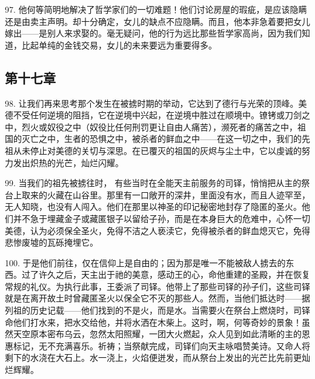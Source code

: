97. 他何等简明地解决了哲学家们的一切难题！他们讨论房屋的瑕疵，是应该隐瞒还是由卖主声明。却十分确定，女儿的缺点不应隐瞒。而且，他本非急着要把女儿嫁出——是别人来求娶的。毫无疑问，他的行为远比那些哲学家高尚，因为我们知道，比起单纯的金钱交易，女儿的未来要远为重要得多。\par


\subsection{第十七章}

\par

98. 让我们再来思考那个发生在被掳时期的举动，它达到了德行与光荣的顶峰。美德不受任何逆境的阻挡，它在逆境中兴起，在逆境中胜过在顺境中。镣铐或刀剑之中，烈火或奴役之中（奴役比任何刑罚更让自由人痛苦），濒死者的痛苦之中，祖国的灭亡之中，生者的恐惧之中，被杀者的鲜血之中——在这一切之中，我们的先祖从未停止对美德的关切与深思。在已覆灭的祖国的灰烬与尘土中，它以虔诚的努力发出炽热的光芒，灿烂闪耀。\par

99. 当我们的祖先被掳往时， 有些当时在全能天主前服务的司铎，悄悄把从主的祭台上取来的火藏在山谷里。那里有一口敞开的深井，里面没有水，而且人迹罕至，无人知晓，也没有人闯入。他们在那里以神圣的印记秘密地封存了隐匿的圣火。他们并不急于埋藏金子或藏匿银子以留给子孙，而是在本身巨大的危难中，心怀一切美德，认为必须保全圣火，免得不洁之人亵渎它，免得被杀者的鲜血熄灭它，免得悲惨废墟的瓦砾掩埋它。\par

100. 于是他们前往，仅在信仰上是自由的；因为那是唯一不能被敌人掳去的东西。过了许久之后，天主出于祂的美意，感动王的心，命他重建的圣殿，并在恢复常规的礼仪。为执行此事，王委派了司铎。他带上了那些司铎的孙子们，这些司铎就是在离开故土时曾藏匿圣火以保全它不灭的那些人。然而，当他们抵达时——据列祖的历史记载——他们找到的不是火，而是水。当需要火在祭台上燃烧时，司铎命他们打水来，把水交给他，并将水洒在木柴上。这时，啊，何等奇妙的景象！虽然天空原本密布乌云，忽然太阳照耀，一团大火燃起，众人见到如此清晰的主的恩惠标记，无不充满喜乐。祈祷；当祭献完成，司铎们向天主咏唱赞美诗。又命人将剩下的水浇在大石上。水一浇上，火焰便迸发，而从祭台上发出的光芒比先前更灿烂辉耀。\par

